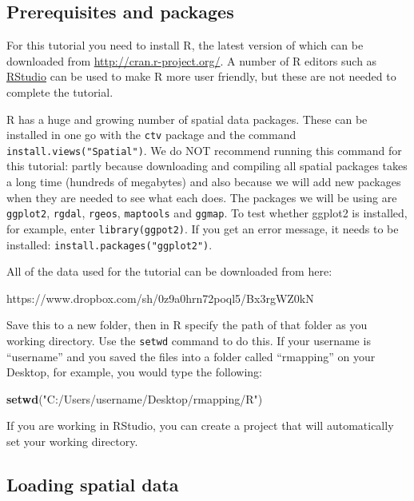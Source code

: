 \documentclass[]{article}
\newenvironment{Shaded}{}{}
\newcommand{\KeywordTok}[1]{\textcolor[rgb]{0.00,0.44,0.13}{\textbf{{#1}}}}
\newcommand{\StringTok}[1]{\textcolor[rgb]{0.25,0.44,0.63}{{#1}}}
\newcommand{\NormalTok}[1]{{#1}}
\begin{document}
\subsection{Prerequisites and packages}

For this tutorial you need to install R, the latest version of which can
be downloaded from
\href{http://cran.r-project.org/}{http://cran.r-project.org/}. A number
of R editors such as \href{http://www.rstudio.com/}{RStudio} can be used
to make R more user friendly, but these are not needed to complete the
tutorial.

R has a huge and growing number of spatial data packages. These can be
installed in one go with the \texttt{ctv} package and the command
\texttt{install.views("Spatial")}. We do NOT recommend running this
command for this tutorial: partly because downloading and compiling all
spatial packages takes a long time (hundreds of megabytes) and also
because we will add new packages when they are needed to see what each
does. The packages we will be using are \texttt{ggplot2},
\texttt{rgdal}, \texttt{rgeos}, \texttt{maptools} and \texttt{ggmap}. To
test whether ggplot2 is installed, for example, enter
\texttt{library(ggpot2)}. If you get an error message, it needs to be
installed: \texttt{install.packages("ggplot2")}.

All of the data used for the tutorial can be downloaded from here:

https://www.dropbox.com/sh/0z9a0hrn72poql5/Bx3rgWZ0kN

Save this to a new folder, then in R specify the path of that folder as
you working directory. Use the \texttt{setwd} command to do this. If
your username is ``username'' and you saved the files into a folder
called ``rmapping'' on your Desktop, for example, you would type the
following:

\begin{Shaded}
\begin{Highlighting}[]
\KeywordTok{setwd}\NormalTok{(}\StringTok{"C:/Users/username/Desktop/rmapping/R"}\NormalTok{)}
\end{Highlighting}
\end{Shaded}
If you are working in RStudio, you can create a project that will
automatically set your working directory.

\subsection{Loading spatial data}
\end{document}
